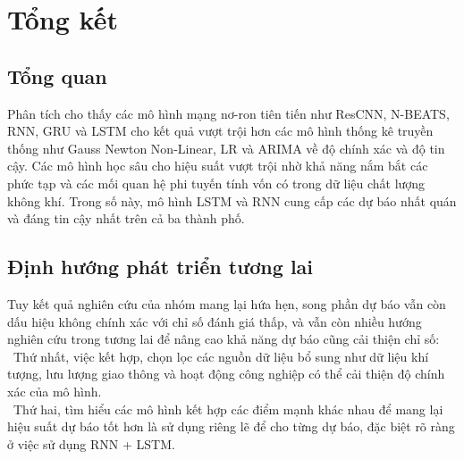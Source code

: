\documentclass[conference]{IEEEtran}
\begin{document}
\section{Tổng kết}
\subsection{Tổng quan}
Phân tích cho thấy các mô hình mạng nơ-ron tiên tiến như ResCNN, N-BEATS, RNN, GRU và LSTM cho kết quả vượt trội hơn các mô hình thống kê truyền thống như Gauss Newton Non-Linear, LR và ARIMA về độ chính xác và độ tin cậy. Các mô hình học sâu cho hiệu suất vượt trội nhờ khả năng nắm bắt các phức tạp và các mối quan hệ phi tuyến tính vốn có trong dữ liệu chất lượng không khí. Trong số này, mô hình LSTM và RNN cung cấp các dự báo nhất quán và đáng tin cậy nhất trên cả ba thành phố.
\subsection{Định hướng phát triển tương lai}
Tuy kết quả nghiên cứu của nhóm mang lại hứa hẹn, song phần dự báo vẫn còn dấu hiệu không chính xác với chỉ số đánh giá thấp, và vẫn còn nhiều hướng nghiên cứu trong tương lai để nâng cao khả năng dự báo cũng cải thiện chỉ số:\\
\indent\textbullet\ Thứ nhất, việc kết hợp, chọn lọc các nguồn dữ liệu bổ sung như dữ liệu khí tượng, lưu lượng giao thông và hoạt động công nghiệp có thể cải thiện độ chính xác của mô hình.\\
\indent\textbullet\ Thứ hai, tìm hiểu các mô hình kết hợp các điểm mạnh khác nhau để mang lại hiệu suất dự báo tốt hơn là sử dụng riêng lẽ để cho từng dự báo, đặc biệt rõ ràng ở việc sử dụng RNN + LSTM.
\end{document}
